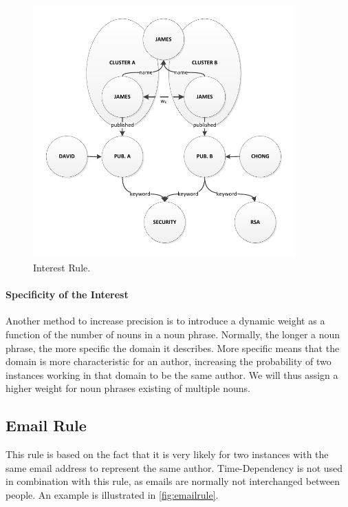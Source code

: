 \begin{figure}[h!]
	\centering
		\includegraphics[width=0.9\textwidth]{fig/interestrule}
	\caption{Interest Rule.}
	\label{fig:interestrule}
\end{figure}

\paragraph{Specificity of the Interest} Another method to increase precision is to introduce a dynamic weight as a function of the number of nouns in a noun phrase. Normally, the longer a noun phrase, the more specific the domain it describes. More specific means that the domain is more characteristic for an author, increasing the probability of two instances working in that domain to be the same author. We will thus assign a higher weight for noun phrases existing of multiple nouns.

\subsection{Email Rule}
\label{emailrule}

This rule is based on the fact that it is very likely for two instances with the same email address to represent the same author. Time-Dependency is not used in combination with this rule, as emails are normally not interchanged between people. An example is illustrated in \autoref{fig:emailrule}.

